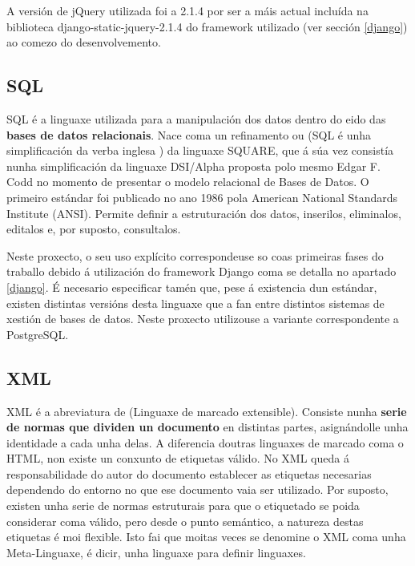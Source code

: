 A versión de jQuery utilizada foi a 2.1.4 por ser a máis actual incluída na biblioteca django-static-jquery-2.1.4\cite{dj-jquery} do framework utilizado (ver sección \ref{django}) ao comezo do desenvolvemento.



\subsection{SQL}

SQL é a linguaxe utilizada para a manipulación dos datos dentro do eido das \textbf{bases de datos relacionais}. Nace coma un refinamento ou  (SQL é unha simplificación da verba inglesa ) da linguaxe SQUARE, que á súa vez consistía nunha simplificación da linguaxe DSI/Alpha proposta polo mesmo Edgar F. Codd no momento de presentar o modelo relacional de Bases de Datos. O primeiro estándar foi publicado no ano 1986 pola American National Standards Institute (ANSI)\cite{sql1}. Permite definir a estruturación dos datos, inserilos, eliminalos, editalos e, por suposto, consultalos.

Neste proxecto, o seu uso explícito correspondeuse so coas primeiras fases do traballo debido á utilización do framework Django coma se detalla no apartado \ref{django}. É necesario especificar tamén que, pese á existencia dun estándar, existen distintas versións desta linguaxe que a fan  entre distintos sistemas de xestión de bases de datos\cite{sql2}. Neste proxecto utilizouse a variante correspondente a PostgreSQL.


\subsection{XML}

XML é a abreviatura de  (Linguaxe de marcado extensible). Consiste nunha \textbf{serie de normas que dividen un documento} en distintas partes, asignándolle unha identidade a cada unha delas. A diferencia doutras linguaxes de marcado coma o HTML, non existe un conxunto de etiquetas válido. No XML queda á responsabilidade do autor do documento establecer as etiquetas necesarias dependendo do entorno no que ese documento vaia ser utilizado. Por suposto, existen unha serie de normas estruturais para que o etiquetado se poida considerar coma válido, pero desde o punto semántico, a natureza destas etiquetas é moi flexible. Isto fai que moitas veces se denomine o XML coma unha Meta-Linguaxe, é dicir, unha linguaxe para definir linguaxes\cite{xml1}.

